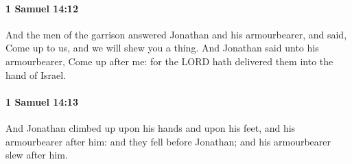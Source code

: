 		\paragraph{1 Samuel 14:12} %
			\label{1SAMUEL-14-12}

			And the men of the garrison answered Jonathan and his armourbearer, and said, Come up to us, and we will shew you a thing. And Jonathan said unto his armourbearer, Come up after me: for the LORD hath delivered them into the hand of Israel.


		\paragraph{1 Samuel 14:13} %
			\label{1SAMUEL-14-13}

			And Jonathan climbed up upon his hands and upon his feet, and his armourbearer after him: and they fell before Jonathan; and his armourbearer slew after him.

